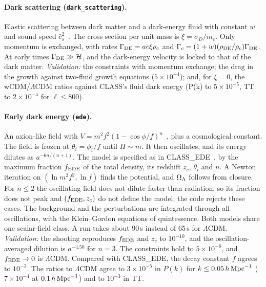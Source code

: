 \paragraph*{Dark scattering (\texttt{dark\_scattering}).} Elastic scattering between dark matter and a dark-energy
fluid with constant $w$ and sound speed $\hat c_s^2$~\cite{Simpson2010}. The cross section per unit mass is
$\xi=\sigma_D/m_c$. Only momentum is exchanged, with rates $\Gamma_{\rm DE}=ac\xi\rho_c$ and
$\Gamma_c=(1+w)(\rho_{\rm DE}/\rho_c)\Gamma_{\rm DE}$. At early times $\Gamma_{\rm DE}\gg\mathcal{H}$, and the
dark-energy velocity is locked to that of the dark matter. \emph{Validation:} the constraints with momentum exchange;
the drag in the growth against two-fluid growth equations ($5\times10^{-4}$); and, for $\xi=0$, the wCDM/$\Lambda$CDM
ratios against CLASS's fluid dark energy (P(k) to $5\times10^{-5}$, TT to $2\times10^{-4}$ for $\ell\le800$).

\paragraph*{Early dark energy (\texttt{ede}).} An axion-like field with
$V=m^2f^2(1-\cos\phi/f)^n$~\cite{Poulin2019,Smith2020}, plus a cosmological constant. The field is frozen at
$\theta_i=\phi_i/f$ until $H\sim m$. It then oscillates, and its energy dilutes as $a^{-6n/(n+1)}$. The model is
specified as in CLASS\_EDE~\cite{Hill2020}, by the maximum fraction $f_{\rm EDE}$ of the total density, its
redshift $z_c$, $\theta_i$ and $n$. A Newton iteration on $(\ln m^2f^2,\ln f)$ finds the potential, and $\Omega_\Lambda$
follows from closure. For $n\le2$ the oscillating field does not dilute faster than radiation, so its fraction does
not peak and $(f_{\rm EDE},z_c)$ do not define the model; the code rejects these cases. The background and the
perturbations are integrated through all oscillations, with the Klein--Gordon equations of quintessence. Both
models share one scalar-field class. A run takes about 90\,s instead of 65\,s for $\Lambda$CDM. \emph{Validation:}
the shooting reproduces $f_{\rm EDE}$ and $z_c$ to $10^{-10}$, and the oscillation-averaged dilution is
$a^{-4.50}$ for $n=3$. The constraints hold to $5\times10^{-6}$, and $f_{\rm EDE}\to0$ is $\Lambda$CDM. Compared
with CLASS\_EDE, the decay constant $f$ agrees to $10^{-3}$. The ratios to $\Lambda$CDM agree to $3\times10^{-5}$ in
$P(k)$ for $k\le0.05\,h\,\mathrm{Mpc}^{-1}$ ($7\times10^{-4}$ at $0.1\,h\,\mathrm{Mpc}^{-1}$) and to $10^{-3}$ in TT.

